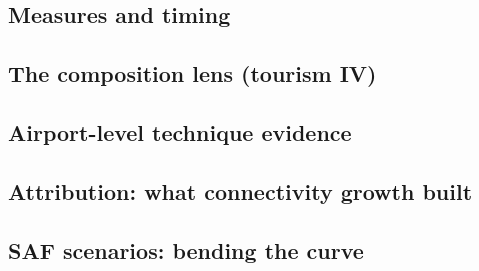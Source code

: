 \documentclass[12pt]{article}
\begin{document}
\subsection{Measures and timing}
\subsection{The composition lens (tourism IV)}
\subsection{Airport-level technique evidence}
\subsection{Attribution: what connectivity growth built}
\subsection{SAF scenarios: bending the curve}
\end{document}

